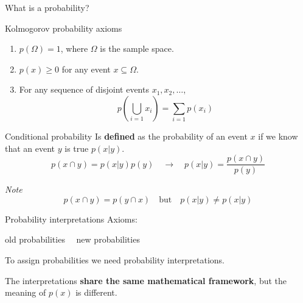 \documentclass[
aspectratio=169,
14pt,
professionalfonts
]{beamer}
\newcommand{\arrow}{~\ding{220}~}
\begin{document}
\begin{frame}
\centering
\Large
What is a probability?
\end{frame}

\begin{frame}{Kolmogorov probability axioms}
\begin{enumerate}
  \item $ p(\Omega) = 1 $, where \( \Omega \) is the sample space.
  \item $ p(x) \geq 0 $ for any event \( x \subseteq \Omega \).
  \item For any sequence of disjoint events \( x_1, x_2, \dots \),
        $$
        p\left( \bigcup_{i=1} x_i \right) = \sum_{i=1} p(x_i)
        $$
\end{enumerate}
\end{frame}


\begin{frame}{Conditional probability}
Is \textbf{defined} as the probability of an event $x$ if we know that an event $y$ is true $p(x|y)$.
$$p(x \cap y) = p(x|y)p(y) \quad \to \quad p(x|y) = \frac{p(x \cap y)}{p(y)}$$

\textit{Note} 
$$p(x \cap y) = p(y \cap x) \quad  \text{but} \quad p(x|y) \neq p(x|y)$$ 
\end{frame}

\begin{frame}{Probability interpretations}
    Axioms:
    \begin{center}
        old probabilities \arrow new probabilities
    \end{center}
    
    \vspace{0.5cm}
    To assign probabilities we need probability interpretations.

    \vspace{0.5cm}
    The interpretations \textbf{share the same mathematical framework}, but the meaning of $p(x)$ is different.
\end{frame}
\end{document}
